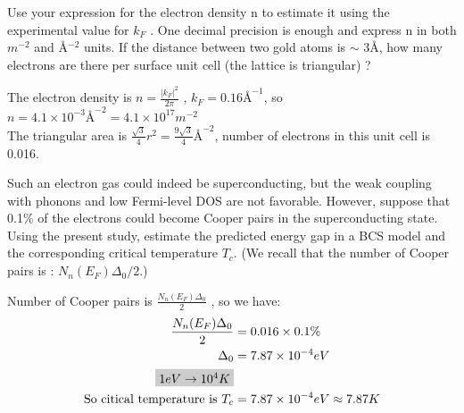 \documentclass[answers]{exam}
\begin{document}
\begin{questions}
\question Use your expression for the electron density n to estimate it using the experimental value for $k_{F}$ . One decimal precision is enough and express n in both
$m^{-2}$ and \AA$^{-2}$ units. If the distance between two gold atoms is $\sim$ 3\AA, how
many electrons are there per surface unit cell (the lattice is triangular) ?
\begin{solution}
The electron density is $ n =\frac{|k_{F}|^2}{2\pi}$ , $k_{F}=0.16\text{\AA}^{-1}$, so $n=4.1\times10^{-3}\text{\AA}^{-2}=4.1\times 10^{17}m^{-2}$\\
The triangular area is $\frac{\sqrt{3}}{4}r^2=\frac{9\sqrt{3}}{4}\text{\AA}^{-2}$, number of electrons in this unit cell is 0.016.
\end{solution}



\question  Such an electron gas could indeed be superconducting, but the weak coupling
with phonons and low Fermi-level DOS are not favorable. However, suppose
that 0.1\% of the electrons could become Cooper pairs in the superconducting
state. Using the present study, estimate the predicted energy gap in a BCS
model and the corresponding critical temperature $T_{c}$. (We recall that the
number of Cooper pairs is : $N_{n}(E_{F}) \Delta_{0}/2$.)
\begin{solution}
Number of Cooper pairs is $\frac{N_{n}(E_{F})\Delta_{0}}{2}$ , so we have:
\begin{align*}
\frac{N_{n}(E_{F})\Delta_{0}}{2} &= 0.016\times0.1\%\\
\Delta_{0} &= 7.87\times10^{-4}eV \\
\colorbox[gray]{0.8}{$1eV \rightarrow 10^{4}K$} \\
\text{So citical temperature is } T_{c}&=7.87\times10^{-4}eV \approx 7.87K
\end{align*}

\end{solution}


\end{questions}
\end{document}
